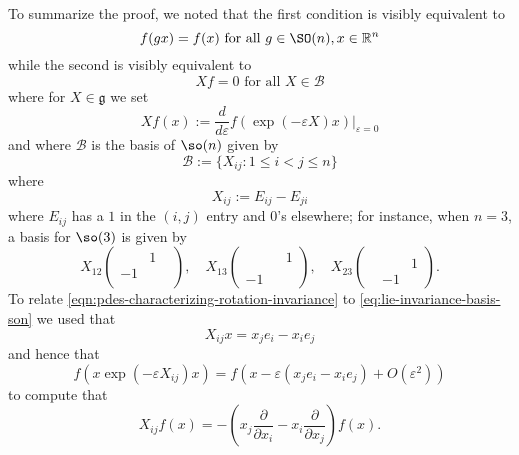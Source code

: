 \documentclass[reqno]{amsart} 
\def\eps{\varepsilon}
\begin{document}
To summarize the proof, we noted that the first condition
is visibly equivalent to
\begin{equation}\label{eq:group-invariance-son}
    f(g x) = f(x) \text{ for all } g \in \SO(n), x \in \mathbb{R}^n
\end{equation}
while the second is visibly equivalent to
\begin{equation}\label{eq:lie-invariance-basis-son}
    X f = 0 \text{ for all } X \in \mathcal{B}
\end{equation}
where for $X \in \mathfrak{g}$
we set
\begin{equation*}
  X f(x) := \frac{d}{d \eps} f(\exp(-\eps  X) x) |_{\eps=0}
\end{equation*}
and
where
$\mathcal{B}$ is the basis of $\so(n)$
given by
\begin{equation*}
  \mathcal{B} := \{X_{i j} : 1 \leq i < j \leq n\}
\end{equation*}
where
\begin{equation*}
  X_{i j} := E_{i j} - E_{j i}
\end{equation*}
where
$E_{i j}$ has a $1$ in the $(i,j)$ entry and $0$'s elsewhere;
for instance,
when $n = 3$,
a basis for $\so(3)$ is given by
\begin{equation*}
  X_{12}
  \begin{pmatrix}
    & 1 &  \\
    -1 &  &  \\
    &  & 
  \end{pmatrix}
,
  \quad 
  X_{13}
  \begin{pmatrix}
    &  & 1\\
    &  &  \\
    -1 &  & 
  \end{pmatrix}
,
  \quad 
  X_{23}
  \begin{pmatrix}
    &  & \\
    &  & 1 \\
    & -1  & 
  \end{pmatrix}
.
\end{equation*}
To relate \eqref{eqn:pdes-characterizing-rotation-invariance}
to \eqref{eq:lie-invariance-basis-son}
we used that
\begin{equation*}
  X_{i j} x =
  x_j e_i - x_i e_j
\end{equation*}
and hence that
\begin{equation*}
  f(x \exp(-\eps X_{i j}) x)
  = f(x  -  \eps  (x_j e_i - x_i e_j) + O(\eps ^2))
\end{equation*}
to compute that
\begin{equation*}
  X_{i j} f(x) = -
  (x_j \frac{\partial }{\partial x_i}
  - x_i \frac{\partial }{\partial x_j}
  ) f(x).
\end{equation*}
\end{document}

